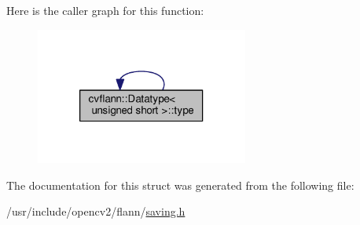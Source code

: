 Here is the caller graph for this function\-:\nopagebreak
\begin{figure}[H]
\begin{center}
\leavevmode
\includegraphics[width=198pt]{structcvflann_1_1Datatype_3_01unsigned_01short_01_4_a6d3b9b8757e8cf3092202de1f1998e49_icgraph}
\end{center}
\end{figure}




The documentation for this struct was generated from the following file\-:\begin{DoxyCompactItemize}
\item 
/usr/include/opencv2/flann/\hyperlink{saving_8h}{saving.\-h}\end{DoxyCompactItemize}
